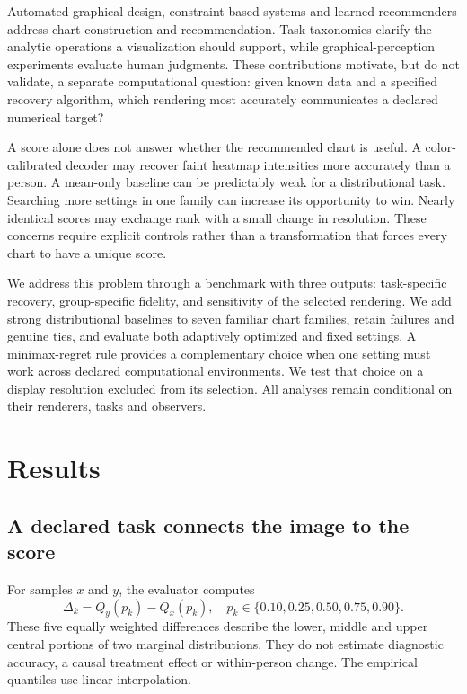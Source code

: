 \documentclass[11pt]{article}
\begin{document}
Automated graphical design, constraint-based systems and learned recommenders address chart construction and recommendation.\cite{mackinlay1986,draco,vizml} Task taxonomies clarify the analytic operations a visualization should support, while graphical-perception experiments evaluate human judgments.\cite{amar2005,cleveland1984} These contributions motivate, but do not validate, a separate computational question: given known data and a specified recovery algorithm, which rendering most accurately communicates a declared numerical target?

A score alone does not answer whether the recommended chart is useful. A color-calibrated decoder may recover faint heatmap intensities more accurately than a person. A mean-only baseline can be predictably weak for a distributional task. Searching more settings in one family can increase its opportunity to win. Nearly identical scores may exchange rank with a small change in resolution. These concerns require explicit controls rather than a transformation that forces every chart to have a unique score.

We address this problem through a benchmark with three outputs: task-specific recovery, group-specific fidelity, and sensitivity of the selected rendering. We add strong distributional baselines to seven familiar chart families, retain failures and genuine ties, and evaluate both adaptively optimized and fixed settings. A minimax-regret rule provides a complementary choice when one setting must work across declared computational environments. We test that choice on a display resolution excluded from its selection. All analyses remain conditional on their renderers, tasks and observers.

\section*{Results}
\subsection*{A declared task connects the image to the score}
For samples $x$ and $y$, the evaluator computes
\begin{equation}
\Delta_k=Q_y(p_k)-Q_x(p_k),\quad p_k\in\{0.10,0.25,0.50,0.75,0.90\}.
\label{eq:target}
\end{equation}
These five equally weighted differences describe the lower, middle and upper central portions of two marginal distributions. They do not estimate diagnostic accuracy, a causal treatment effect or within-person change. The empirical quantiles use linear interpolation.
\end{document}
